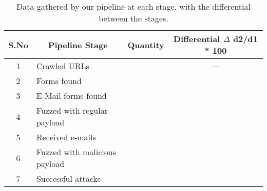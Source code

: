 \begin{table}[!htbp]
	\centering
	\begin{tabular}{|c|l|c|c|}
		\hline
		\multicolumn{1}{|c|}{\textbf{S.No}} &
		\multicolumn{1}{c|}{\textbf{Pipeline Stage}} &
		\multicolumn{1}{p{3cm}|}{\centering \textbf{Quantity}} &
		\multicolumn{1}{p{2.8cm}|}{\centering \textbf{Differential}
		$\Delta$ d2/d1 * 100}\\
		\hline
		1 &  Crawled URLs  & \urls &  --- \\
		\hline
		2 &  Forms found  & \forms & \formsDelta \\
		\hline
		3 &  E-Mail forms found  & \emailforms & \emailformsDelta \\
		\hline
		4 &  Fuzzed with regular payload  & \fuzzed & \fuzzedDelta \\
		\hline
		5 &  Received e-mails  & \recd & \recdDelta \\
		\hline
		6 &  Fuzzed with malicious payload  & \malfuzzed & \malfuzzedDelta \\
		\hline
		7 &  Successful attacks  & \success & \successDelta \\
		\hline

	\end{tabular}
	\caption[]{Data gathered by our pipeline at each stage, with the differential between the stages.}
	\label{tab:pipeline}
\end{table}